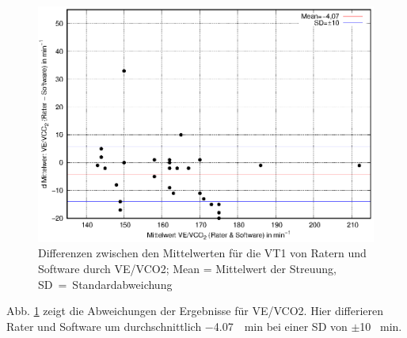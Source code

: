 \begin{figure}[H]
	\centering
	\includegraphics[scale=0.95]{Bilder/vevco2.eps}
	\caption[Differenzen der \gls{VE}/\gls{VCO2}-Ergebnisse zwischen Ratern und Software]{Differenzen zwischen den Mittelwerten für die VT1 von Ratern und Software durch \gls{VE}/\gls{VCO2}; Mean = Mittelwert der Streuung, SD~=~Standardabweichung}
	\label{pic:pic27}
\end{figure}
%
Abb. \ref{pic:pic27} zeigt die Abweichungen der Ergebnisse für \gls{VE}/\gls{VCO2}. Hier differieren Rater und Software um durchschnittlich \SI{-4,07}{\per\minute} bei einer \gls{SD} von $\pm$10 \si{\per\minute}.